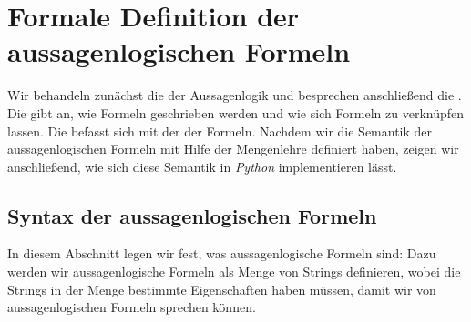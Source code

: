 \section{Formale Definition der aussagenlogischen Formeln}
Wir behandeln zunächst die  der Aussagenlogik und besprechen anschließend die
.  Die  gibt an, wie Formeln geschrieben werden und wie sich Formeln zu
 verknüpfen lassen.  Die  befasst sich mit der  der Formeln.
Nachdem wir die Semantik der aussagenlogischen Formeln mit Hilfe der Mengenlehre definiert haben, zeigen wir
anschließend, wie sich diese Semantik in \textsl{Python} implementieren lässt.

\subsection{Syntax der aussagenlogischen Formeln}
In diesem Abschnitt legen wir fest, was aussagenlogische Formeln sind:  Dazu werden wir aussagenlogische
Formeln als Menge von Strings definieren, wobei die Strings in der Menge bestimmte Eigenschaften haben müssen,
damit wir von aussagenlogischen Formeln sprechen können.

